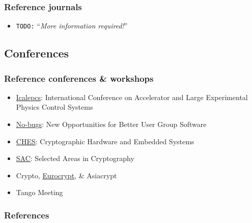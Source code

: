 \documentclass{beamer}
\newcommand{\todo}[1]{\texttt{\color{red}TODO:} ``\emph{#1}''}
\begin{document}
\begin{frame}
\frametitle{Reference journals}
    \begin{itemize}
        \item \todo{More information required!}
    \end{itemize}
\end{frame}

\subsection{Conferences}

\begin{frame}
\frametitle{Reference conferences \& workshops}
\begin{itemize}
    \item \href{http://www.icalepcs.org/}{Icalepcs}: International Conference on Accelerator and Large Experimental Physics Control Systems
    \item \href{http://www.nobugsconference.org/}{No-bugs}: New Opportunities for Better User Group Software
    \item \href{http://www.chesworkshop.org/}{CHES}: Cryptographic Hardware and Embedded Systems
    \item \href{http://www.sacconference.org/}{SAC}: Selected Areas in Cryptography
    \item Crypto, \href{http://www.iacr.org/meetings/eurocrypt/}{Eurocrypt}, \& Asiacrypt
    \item Tango Meeting
\end{itemize}

\end{frame}

\begin{frame}[allowframebreaks]
        \frametitle{References}
        
        
\end{frame}
\end{document}
